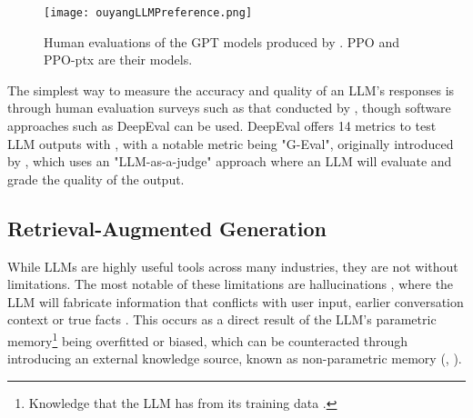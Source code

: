 
\begin{figure}[H] 
    \centering
    \texttt{[image: ouyangLLMPreference.png]}
    \caption{Human evaluations of the GPT models produced by \textcite{ouyang_training_2022}. PPO and PPO-ptx are their models.}
    \label{fig:LLMPref}
\end{figure}

The simplest way to measure the accuracy and quality of an LLM's responses is through human evaluation surveys such as that conducted by \textcite{ouyang_training_2022}, though
software approaches such as DeepEval can be used. DeepEval offers 14 metrics to test LLM outputs with \autocite{deepeval_introduction_2024},
with a notable metric being "G-Eval", originally introduced by \textcite{liu_g-eval_2023}, which uses an "LLM-as-a-judge" approach where an LLM will evaluate
and grade the quality of the output.


\subsection{Retrieval-Augmented Generation}

While LLMs are highly useful tools across many industries, they are not without limitations. The most notable 
of these limitations are hallucinations \autocite{lewis_retrieval-augmented_2021}, where the LLM will fabricate 
information that conflicts with user input, earlier conversation context or true facts \autocite{zhang_sirens_2023}. This occurs as a direct result of the LLM's parametric memory\footnote{Knowledge that the LLM has from its training data \autocite{siriwardhana_improving_2023}.}
being overfitted or biased, which can be counteracted through introducing an external knowledge source, known as non-parametric memory (\textcite{komeili_internet-augmented_2022}, \textcite{siriwardhana_improving_2023}).

